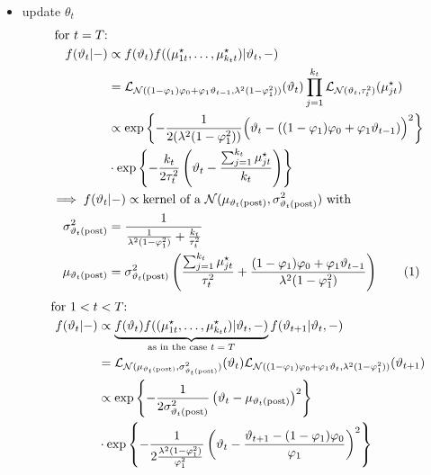 \documentclass[12pt,	%
	a4paper,		%
	twoside,		%
	openright,		%
	titlepage,%
	]{book}
\theoremstyle{definition}
\begin{document}
\begin{itemize}
\item update $\theta_t$
\begin{align*}
    \text{for $t=T$:}&\\
    f(\theta_t|-)&\propto f(\theta_t)f((\mu^\star_{1t},\ldots,\mu^\star_{k_tt})|\theta_t,-)\\
    &=\law_{\N((1-\phi_1)\phi_0 + \phi_1\theta_{t-1},\lambda^2(1-\phi_1^2))}(\theta_t)\prod_{j=1}^{k_t} \law_{\N(\theta_t,\tau^2_t)}(\mu^\star_{jt})\\
    &\propto\expp{-\frac{1}{2(\lambda^2(1-\phi_1^2))}\Big(\theta_t - ((1-\phi_1)\phi_0+\phi_1\theta_{t-1})\Big)^2}\\
    &\cdot \expp{-\frac{k_t}{2\tau^2_t}\left(\theta_t - \frac{\sum_{j=1}^{k_t}\mu^\star_{jt}}{k_t}\right)}\\
    \implies f(\theta_t&|-)\propto \text{kernel of a $\N(\mu_{\postp{\theta_t}},\sigma^2_{\postp{\theta_t}})$ with}\\
    \sigma^2_{\postp{\theta_t}}&=\dfrac{1}{\frac{1}{\lambda^2(1-\phi_1^2)}+\frac{k_t}{\tau_t^2}}\\
    \mu_{\postp{\theta_t}}&=\sigma^2_{\postp{\theta_t}}\left(\frac{\sum_{j=1}^{k_t}\mu^\star_{jt}}{\tau^2_t} + \frac{(1-\phi_1)\phi_0+\phi_1\theta_{t-1}}{\lambda^2(1-\phi_1^2)} \right)
    \tag{\stepcounter{equation}\theequation}
\end{align*}
\begin{align*}
    \text{for } 1<t&<T\text{:}\\
    f(\theta_t|-)&\propto \underbrace{f(\theta_t)f((\mu^\star_{1t},\ldots,\mu^\star_{k_tt})|\theta_t,-)}_{\text{as in the case $t=T$}} f(\theta_{t+1}|\theta_t,-)\\
    &=\law_{\N( \mu_{\postp{\theta_t}},\sigma^2_{\postp{\theta_t}})}(\theta_t) \law_{\N((1-\phi_1)\phi_0 + \phi_1\theta_{t},\lambda^2(1-\phi_1^2))}(\theta_{t+1})\\
    &\propto\expp{-\frac{1}{2\sigma^2_{\postp{\theta_t}}}\left(\theta_t -\mu_{\postp{\theta_t}}\right)^2}\\& \cdot \expp{-\frac{1}{2\frac{\lambda^2(1-\phi_1^2)}{\phi_1^2}}\left(\theta_t - \frac{\theta_{t+1}-(1-\phi_1)\phi_0}{\phi_1}\right)^2}\\

\end{align*}
\end{itemize}
\end{document}
